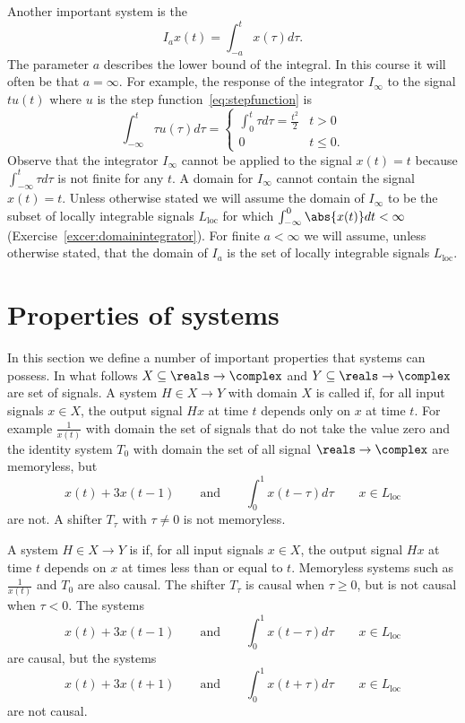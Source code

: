 Another important system is the 
\[
I_a x(t) = \int_{-a}^{t} x(\tau) d\tau.
\]
The parameter $a$ describes the lower bound of the integral.  In this course it will often be that $a=\infty$.  For example, the response of the integrator $I_{\infty}$ to the signal $t u(t)$ where $u$ is the step function~\eqref{eq:stepfunction} is
\[
\int_{-\infty}^{t} \tau u(\tau) d\tau = \begin{cases}
\int_{0}^{t} \tau d\tau = \frac{t^2}{2} & t > 0 \\
0 & t \leq 0.
\end{cases}
\]
Observe that the integrator $I_\infty$ cannot be applied to the signal $x(t) = t$ because $\int_{-\infty}^{t} \tau d\tau$ is not finite for any $t$.  A domain for $I_\infty$ cannot contain the signal $x(t) = t$.  %
Unless otherwise stated we will assume the domain of $I_\infty$ to be the subset of locally integrable signals $L_{\text{loc}}$ for which $\int_{-\infty}^0 \abs{x(t)} dt < \infty$ (Exercise~\ref{excer:domainintegrator}).  For finite $a < \infty$ we will assume, unless otherwise stated, that the domain of $I_a$ is the set of locally integrable signals $L_{\text{loc}}$. %


\section{Properties of systems}\label{sec:properties-systems}

In this section we define a number of important properties that systems can possess.  In what follows $X \subseteq \reals \to \complex$ and $Y \subseteq \reals \to \complex$ are set of signals.  A system $H \in X \to Y$ with domain $X$ is called  if, for all input signals $x \in X$, the output signal $Hx$ at time $t$ depends only on $x$ at time $t$.  For example $\frac{1}{x(t)}$ with domain the set of signals that do not take the value zero and the identity system $T_0$ with domain the set of all signal $\reals \to \complex$ are memoryless, but 
\[
x(t) + 3 x(t-1) \qquad \text{and} \qquad \int_{0}^{1} x(t - \tau) d\tau \qquad x \in L_{\text{loc}}
\] 
are not.  A shifter $T_\tau$ with $\tau \neq 0$ is not memoryless.

A system $H \in X \to Y$ is  if, for all input signals $x \in X$, the output signal $Hx$ at time $t$ depends on $x$ at times less than or equal to $t$.  Memoryless systems such as $\frac{1}{x(t)}$ and $T_0$ are also causal.  The shifter $T_\tau$ is causal when $\tau \geq 0$, but is not causal when $\tau < 0$.  The systems 
\[
x(t) + 3 x(t-1) \qquad \text{and} \qquad \int_{0}^{1} x(t - \tau) d\tau \qquad x \in L_{\text{loc}}
\] 
are causal, but the systems 
\[
x(t) + 3 x(t+1) \qquad \text{and} \qquad \int_{0}^{1} x(t + \tau) d\tau \qquad x \in L_{\text{loc}}
\] 
are not causal.

